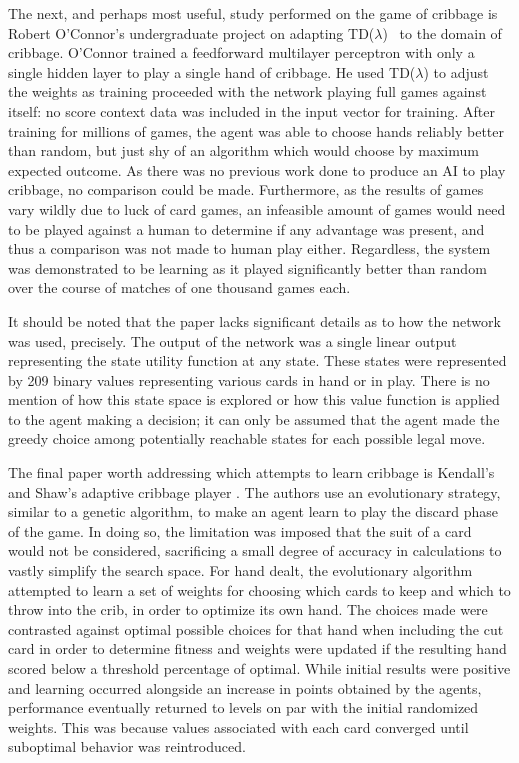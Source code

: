 The next,
and perhaps most useful,
study performed on the game of cribbage is Robert O'Connor's undergraduate
project
\cite{roconnor_cs486}
on adapting TD($\lambda$)~\cite{tdgammon} to the domain of cribbage.
%
O'Connor trained a feedforward multilayer perceptron with only a single hidden
layer to play a single hand of cribbage.
%
He used TD($\lambda$) to adjust the weights as training proceeded with the
network playing full games against itself:
no score context data was included in the input vector for training.
%
After training for millions of games,
the agent was able to choose hands reliably better than random,
but just shy of an algorithm which would choose by maximum expected outcome.
%
As there was no previous work done to produce an AI to play cribbage,
no comparison could be made.
%
Furthermore,
as the results of games vary wildly due to luck of card games,
an infeasible amount of games would need to be played against a human to
determine if any advantage was present,
and thus a comparison was not made to human play either.
%
Regardless,
the system was demonstrated to be learning as it played significantly
better than random over the course of matches of one thousand games each.

It should be noted that the paper lacks significant details
as to how the network was used, precisely.
%
The output of the network was a single linear output representing the state
utility function at any state.
%
These states were represented by 209 binary values representing various cards in
hand or in play.
%
There is no mention of how this state space is explored or how this value
function is applied to the agent making a decision;
it can only be assumed that the agent made the greedy choice among potentially
reachable states for each possible legal move.

The final paper worth addressing which attempts to learn cribbage
is Kendall's and Shaw's adaptive cribbage player
\cite{adaptive_cribbage}.
%
The authors use an evolutionary strategy,
similar to a genetic algorithm,
to make an agent learn to play the discard phase of the game.
%
In doing so,
the limitation was imposed that the suit of a card would not be considered,
sacrificing a small degree of accuracy in calculations to vastly simplify the
search space.
%
For hand dealt,
the evolutionary algorithm attempted to learn a set of weights for choosing
which cards to keep and which to throw into the crib,
in order to optimize its own hand.
%
The choices made were contrasted against optimal possible choices for that hand
when including the cut card in order to determine fitness
and weights were updated if the resulting hand scored below a threshold
percentage of optimal.
%
While initial results were positive and learning occurred alongside an increase
in points obtained by the agents,
performance eventually returned to levels on par with the initial randomized
weights.
%
This was because values associated with each card converged until suboptimal
behavior was reintroduced.

